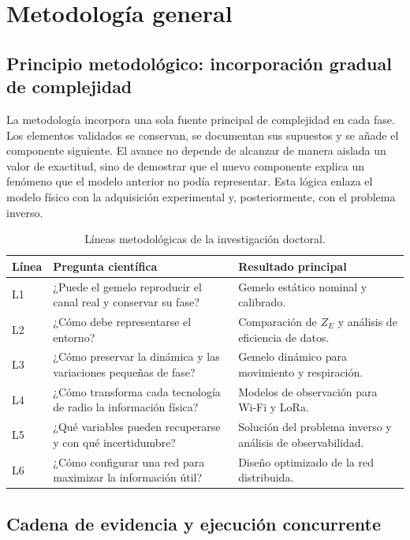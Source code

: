 \chapter{Metodología general}
\label{ch:methodology}

\section{Principio metodológico: incorporación gradual de complejidad}

La metodología incorpora una sola fuente principal de complejidad en cada fase. Los elementos validados se conservan, se documentan sus supuestos y se añade el componente siguiente. El avance no depende de alcanzar de manera aislada un valor de exactitud, sino de demostrar que el nuevo componente explica un fenómeno que el modelo anterior no podía representar. Esta lógica enlaza el modelo físico con la adquisición experimental y, posteriormente, con el problema inverso.

\begin{table}[ht]
\centering
\caption{Líneas metodológicas de la investigación doctoral.}
\label{tab:lineas_metodologicas}
\begin{tabularx}{\textwidth}{p{1.3cm}L L}
\toprule
\textbf{Línea} & \textbf{Pregunta científica} & \textbf{Resultado principal}\\
\midrule
L1 & ¿Puede el gemelo reproducir el canal real y conservar su fase? & Gemelo estático nominal y calibrado.\\
L2 & ¿Cómo debe representarse el entorno? & Comparación de $Z_E$ y análisis de eficiencia de datos.\\
L3 & ¿Cómo preservar la dinámica y las variaciones pequeñas de fase? & Gemelo dinámico para movimiento y respiración.\\
L4 & ¿Cómo transforma cada tecnología de radio la información física? & Modelos de observación para Wi-Fi y LoRa.\\
L5 & ¿Qué variables pueden recuperarse y con qué incertidumbre? & Solución del problema inverso y análisis de observabilidad.\\
L6 & ¿Cómo configurar una red para maximizar la información útil? & Diseño optimizado de la red distribuida.\\
\bottomrule
\end{tabularx}
\end{table}

\section{Cadena de evidencia y ejecución concurrente}
\label{sec:updated_method_chain}

